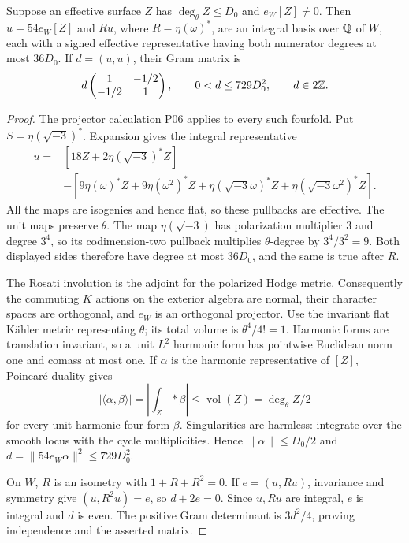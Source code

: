 \begin{proposition}
Suppose an effective surface $Z$ has $\deg_\theta Z\leq D_0$ and
$e_W[Z]\ne0$. Then $u=54e_W[Z]$ and $Ru$, where $R=\eta(\omega)^*$,
are an integral basis over $\mathbb Q$ of $W$, each with a signed effective
representative having both numerator degrees at most $36D_0$. If
$d=(u,u)$, their Gram matrix is
\[
 d\begin{pmatrix}1&-1/2\\-1/2&1\end{pmatrix},
 \qquad 0<d\leq729D_0^2,
 \qquad d\in2\mathbb Z.
\]
\end{proposition}
\begin{proof}
The projector calculation P06 applies to every such fourfold. Put
$S=\eta(\sqrt{-3})^*$. Expansion gives the integral representative
\begin{align*}
 u={}&[18Z+2\eta(\sqrt{-3})^*Z]\\
 &-[9\eta(\omega)^*Z+9\eta(\omega^2)^*Z
       +\eta(\sqrt{-3}\omega)^*Z+
        \eta(\sqrt{-3}\omega^2)^*Z].
\end{align*}
All the maps are isogenies and hence flat, so these pullbacks are effective.
The unit maps preserve $\theta$. The map $\eta(\sqrt{-3})$ has
polarization multiplier $3$ and degree $3^4$, so its codimension-two
pullback multiplies $\theta$-degree by $3^4/3^2=9$. Both displayed sides
therefore have degree at most $36D_0$, and the same is true after $R$.

The Rosati involution is the adjoint for the polarized Hodge metric.
Consequently the commuting $K$ actions on the exterior algebra are normal,
their character spaces are orthogonal, and $e_W$ is an orthogonal
projector. Use the invariant flat K\"ahler metric representing $\theta$;
its total volume is $\theta^4/4!=1$. Harmonic forms are translation
invariant, so a unit $L^2$ harmonic form has pointwise Euclidean norm one
and comass at most one. If $\alpha$ is the harmonic representative of
$[Z]$, Poincar\'e duality gives
\[
 |\langle\alpha,\beta\rangle|
   =\left|\int_Z *\beta\right|
   \leq\operatorname{vol}(Z)=\deg_\theta Z/2
\]
for every unit harmonic four-form $\beta$. Singularities are harmless:
integrate over the smooth locus with the cycle multiplicities. Hence
$\|\alpha\|\leq D_0/2$ and
$d=\|54e_W\alpha\|^2\leq729D_0^2$.

On $W$, $R$ is an isometry with $1+R+R^2=0$. If $e=(u,Ru)$, invariance
and symmetry give $(u,R^2u)=e$, so $d+2e=0$. Since $u,Ru$ are integral,
$e$ is integral and $d$ is even. The positive Gram determinant is
$3d^2/4$, proving independence and the asserted matrix.
\end{proof}

